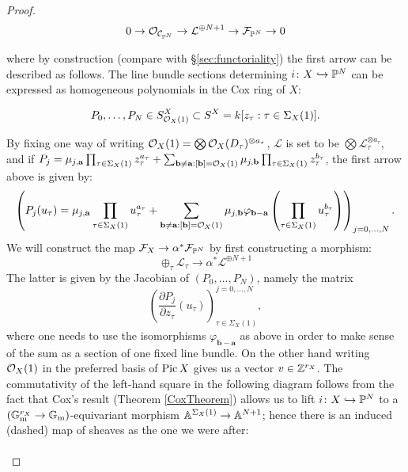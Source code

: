 \begin{proof}
\begin{equation*} 0 \rightarrow \mathcal{O}_{\mathcal{C}_{\mathbb P^N}} \rightarrow \mathcal{L}^{\oplus N+1} \rightarrow \mathcal{F}_{\mathbb P^N} \rightarrow 0 \end{equation*}

\noindent where by construction (compare with \S \ref{sec:functoriality}) the first arrow can be described as follows. The line bundle sections determining $i\colon X\hookrightarrow \mathbb P^N$ can be expressed as homogeneous polynomials in the Cox ring of $X$:

\begin{equation*} P_0,\ldots,P_N \in S^X_{\mathcal{O}_X(1)} \subset S^X = k[z_\tau : \tau \in \Sigma_X(1)]. \end{equation*}

\noindent By fixing one way of writing $\mathcal{O}_X(1)=\bigotimes\mathcal{O}_X(D_\tau)^{\otimes a_\tau}$, $\mathcal L$ is set to be $\bigotimes\mathcal L_\tau^{\otimes a_\tau}$, and if $P_j=\mu_{j,\mathbf a}\prod_{\tau\in\Sigma_X(1)}z_\tau^{a_\tau}+\sum_{\mathbf b\neq \mathbf a:[\mathbf b]=\mathcal{O}_X(1)}\mu_{j,\mathbf b}\prod_{\tau\in\Sigma_X(1)}z_\tau^{b_\tau}$, the first arrow above is given by:
\[\left(P_j(u_\tau)=\mu_{j,\mathbf a}\prod_{\tau\in\Sigma_X(1)}u_\tau^{a_\tau}+\sum_{\mathbf b\neq \mathbf a:[\mathbf b]=\mathcal{O}_X(1)}\mu_{j,\mathbf b}\varphi_{\mathbf b-\mathbf a}\left(\prod_{\tau\in\Sigma_X(1)}u_\tau^{b_\tau}\right)\right)_{j=0,\ldots,N}.\]
We will construct the map $\mathcal{F}_X \rightarrow \alpha^* \mathcal{F}_{\mathbb P^N}$ by first constructing a morphism:
\begin{equation*} \oplus_{\tau} \mathcal{L}_\tau \to \alpha^* \mathcal{L}^{\oplus N+1} \end{equation*}
The latter is given by the Jacobian of $(P_0,\ldots,P_N)$, namely the matrix
\[\left(\frac{\partial P_j}{\partial z_\tau}(u_\tau)\right)^{j=0,\ldots,N}_{\tau\in\Sigma_X(1)},\]
\noindent where one needs to use the isomorphisms $\varphi_{\mathbf b-\mathbf a}$ as above in order to make sense of the sum as a section of one fixed line bundle. On the other hand writing $\mathcal{O}_X(1)$ in the preferred basis of $\operatorname{Pic} X$ gives us a vector $v\in\mathbb{Z}^{r_X}$.
The commutativity of the left-hand square in the following diagram follows from the fact that Cox's result (Theorem \ref{CoxTheorem}) allows us to lift $i\colon X\hookrightarrow\mathbb P^N$ to a $(\mathbb{G}_{\text{m}}^{r_X}\rightarrow\mathbb{G}_{\text{m}})$-equivariant morphism $\mathbb{A}^{\Sigma_X(1)}\rightarrow\mathbb{A}^{N+1}$; hence there is an induced (dashed) map of sheaves as the one we were after:
\begin{equation}\label{diagram:functoriality}
\begin{tikzcd}

\end{tikzcd}
\end{equation}
\end{proof}

